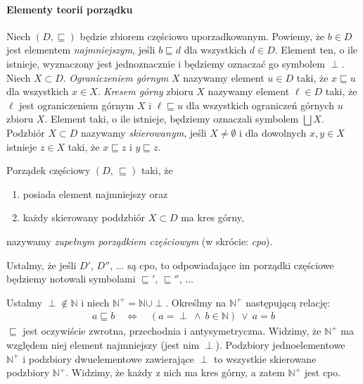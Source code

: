 \paragraph{Elementy teorii porządku} 
Niech \((D,\sqsubseteq)\) będzie zbiorem częściowo uporzadkowanym. Powiemy, że \(b\in D\) jest elementem \emph{najmniejszym}, jeśli \(b\sqsubseteq d\) dla wszystkich \(d\in D\). Element ten, o ile istnieje, wyznaczony jest jednoznacznie i będziemy oznaczać go symbolem \(\perp\). Niech \(X\subset D\). \emph{Ograniczeniem górnym} \(X\) nazywamy element \(u\in D\) taki, że \(x\sqsubseteq u\) dla wszystkich \(x\in X\). \emph{Kresem górny} zbioru \(X\) nazywamy element \(\ell\in D\) taki, że \(\ell\) jest ograniczeniem górnym \(X\) i \(\ell\sqsubseteq u\) dla wszystkich ograniczeń górnych \(u\) zbioru \(X\). Element taki, o ile istnieje, będziemy oznaczali symbolem \(\bigsqcup X\). Podzbiór \(X\subset D\) nazywamy \emph{skierowanym}, jeśli \(X\neq\emptyset\) i dla dowolnych \(x, y\in X\) istnieje \(z\in X\) taki, że \(x\sqsubseteq z\) i \(y\sqsubseteq z\). 

\begin{definicja}%
Porządek częściowy \((D,\,\sqsubseteq)\) taki, że
\begin{enumerate}[label={(\alph*)}, ref={(\alph*)}]
  \setlength\itemsep{0em}
  \item posiada element najmniejszy oraz
  \item każdy skierowany poddzbiór \(X\subset D\) ma kres górny,
\end{enumerate}
  nazywamy \emph{zupełnym porządkiem częściowym} (w skrócie: \emph{cpo}).
\end{definicja}

Ustalmy, że jeśli \(D'\), \(D''\), \(\dots\)  są cpo, to odpowiadające im porządki częściowe będziemy notowali symbolami \(\sqsubseteq'\), \(\sqsubseteq''\), \(\dots\)

\begin{przyklad}\label{ex:scott_d0}
  Ustalmy \(\perp\not\in \mathbb{N}\) i niech \(\mathbb{N}^{+}=\mathbb{N}\cup{\perp}\). Określmy na \(\mathbb{N}^+\) następującą relację:
  \begin{align*}
    a \sqsubseteq b \quad \Leftrightarrow\quad (a=\perp\ \land\ b\in \mathbb{N})\ \lor\ a = b
  \end{align*}
  \(\sqsubseteq\) jest oczywiście zwrotna, przechodnia i antysymetryczna. Widzimy, że \(\mathbb{N}^{+}\) ma względem niej element najmniejszy (jest nim  \(\perp\)). Podzbiory jednoelementowe \(\mathbb{N}^{+}\) i podzbiory dwuelementowe zawierające \(\perp\) to wszystkie skierowane podzbiory \(\mathbb{N}^{+}\). Widzimy, że każdy z nich ma kres górny, a zatem \(\mathbb{N}^{+}\) jest cpo.
\end{przyklad}

